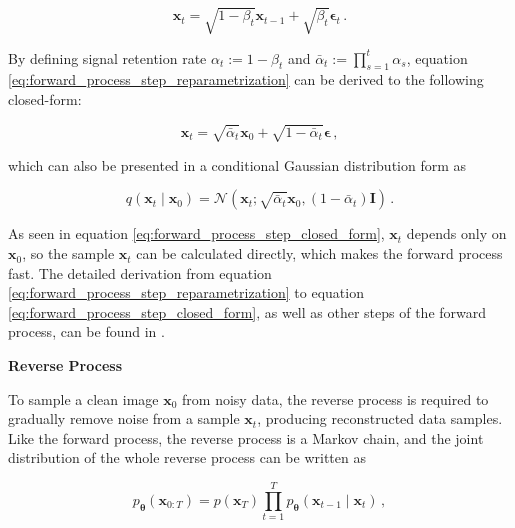 \begin{equation}
    \mathbf{x}_t = \sqrt{1-\beta_{t}} \mathbf{x}_{t-1} + \sqrt{\beta_{t}} \boldsymbol{\epsilon}_t \,.
    \label{eq:forward_process_step_reparametrization} 
\end{equation}

By defining signal retention rate $\alpha_{t}:=1-\beta_{t}$ and $\bar{\alpha}_{t}:=\prod_{s=1}^{t} \alpha_{s}$, equation \ref{eq:forward_process_step_reparametrization} can be derived to the following closed-form:

\begin{equation}
    \mathbf{x}_t = \sqrt{\bar{\alpha}_t} \mathbf{x}_0+\sqrt{1-\bar{\alpha}_t} \boldsymbol{\epsilon} \,,
    \label{eq:forward_process_step_closed_form}
\end{equation}

which can also be presented in a conditional Gaussian distribution form as

\begin{equation}
    q\left(\mathbf{x}_t \mid \mathbf{x}_0\right)=\mathcal{N}\left(\mathbf{x}_t; \sqrt{\bar{\alpha}_t} \mathbf{x}_0,\left(1-\bar{\alpha}_t\right) \mathbf{I}\right) \,.  
    \label{eq:forward_process_step_closed_form_gaussian}
    \end{equation}

As seen in equation \ref{eq:forward_process_step_closed_form}, $\mathbf{x}_t$ depends only on $\mathbf{x}_0$, so the sample $\mathbf{x}_t$ can be calculated directly, which makes the forward process fast.
The detailed derivation from equation \ref{eq:forward_process_step_reparametrization} to equation \ref{eq:forward_process_step_closed_form}, as well as other steps of the forward process, can be found in \cite{strümke2023lecturenotesprobabilisticdiffusion}. 

{\textbf{Reverse Process}}

To sample a clean image $\mathbf{x}_0$ from noisy data, the reverse process is required to gradually remove noise from a sample $\mathbf{x}_t$, producing reconstructed data samples. Like the forward process, the reverse process is a Markov chain, and the joint distribution of the whole reverse process can be written as

\begin{equation}
    p_{\boldsymbol{\theta}}\left(\mathbf{x}_{0: T}\right)=p(\mathbf{x}_T) \prod_{t=1}^{T} p_{\boldsymbol{\theta}}\left(\mathbf{x}_{t-1} \mid \mathbf{x}_{t}\right) \,,
    \label{eq:reverse_process}
\end{equation}

